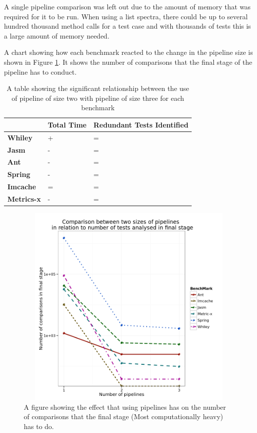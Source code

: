 A single pipeline comparison was left out due to the amount of memory that was required for it to be run. When using a list spectra, there could be up to several hundred thousand method calls for a test case and with thousands of tests this is a large amount of memory needed.

A chart showing how each benchmark reacted to the change in the pipeline size is shown in Figure \ref{fig:pipelinegraph}. It shows the number of comparisons that the final stage of the pipeline has to conduct.

\begin{table}[H]
\centering

\label{pipelinesig}
\begin{tabular}{|l|l|l|}
\hline
{\bf }          & {\bf Total Time} & {\bf Redundant Tests Identified} \\ \hline
{\bf Whiley}    & +                & =                           \\ \hline
{\bf Jasm}      & -                & =                           \\ \hline
{\bf Ant}       & -                & =                           \\ \hline
{\bf Spring}    & -                & =                           \\ \hline
{\bf Imcache}   & =                & =                           \\ \hline
{\bf Metrics-x} & -                & =                           \\ \hline
\end{tabular}
\caption{A table showing the significant relationship between the use of pipeline of size two with pipeline of size three for each benchmark}
\end{table}

\begin{figure}[H]
\begin{center}
\includegraphics[height=10cm, width = 14.5cm]{Pipeline.png}
\end{center}
\caption{A figure showing the effect that using pipelines has on the number of comparisons that the final stage (Most computationally heavy) has to do.}
\label{fig:pipelinegraph}
\end{figure}


